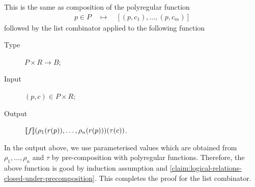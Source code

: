 This is the same as composition of the polyregular function 
\begin{align*}
p \in P  \quad \mapsto \quad [(p,c_1),\ldots,(p,c_m)]
\end{align*}
followed by the  list combinator applied to the following function
\begin{description}
    \item [Type] $P \times R \to B$;
    \item [Input] $(p,c) \in P \times R$;
    \item [Output]  $[\![f]\!] (\rho_1(r(p)),\ldots,\rho_n(r(p)))(\tau(c))$.
\end{description}
In the output above, we use parameterised values which are obtained from $\rho_1,\ldots,\rho_n$ and $\tau$ by pre-composition with polyregular functions. Therefore, the above function is good by induction assumption and \cref{claim:logical-relations-closed-under-precomposition}. This completes the proof for the list combinator. 




